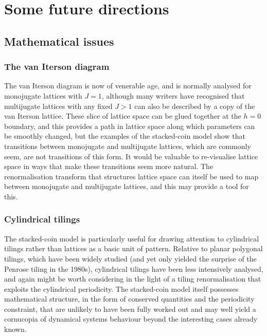 
\chapter{Some future directions}

\section{Mathematical issues}
\subsection{The van Iterson diagram}
The van Iterson diagram is now of venerable age, and is normally analysed for monojugate lattices with $J=1$, although many writers have recognised that multijugate lattices with any fixed $J>1$ can also be described by a copy of the van Iterson lattice. These slice of lattice space can be glued together at the $h=0$ boundary, and this provides a path in lattice space along which parameters can be smoothly changed, but the examples of the stacked-coin model show that transitions between monojugate and multijugate lattices, which are commonly seem, are not transitions of this form. It would be valuable to re-visualise lattice space in ways that make these transitions seem more natural. 
The renormalisation transform that structures lattice space can itself be used to map between monojugate and multijugate lattices, and this may provide a tool for this.

\subsection{Cylindrical tilings}
The stacked-coin model is particularly useful for drawing attention to cylindrical tilings rather than lattices as a basic unit of pattern. Relative to planar polygonal tilings, which have been widely studied (and yet only yielded the surprise of the Penrose tiling in the 1980s), cylindrical tilings have been less intensively analysed, and again might be worth considering in the light of a tiling renormalisation that exploits the cylindrical periodicity. The stacked-coin model itself possesses mathematical structure, in the form of conserved quantities and the periodicity constraint, that are unlikely to have been fully worked out and may well yield a cornucopia of dynamical systems behaviour beyond the interesting cases already known.
 
